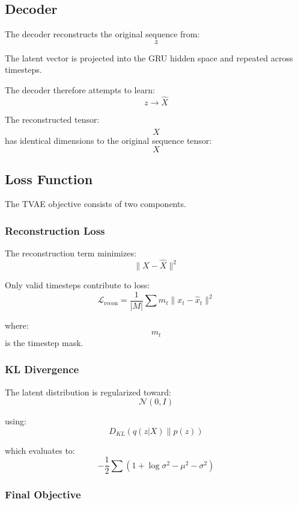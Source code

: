 \documentclass[11pt]{article}
\begin{document}
\subsection{Decoder}

The decoder reconstructs the original sequence from:
\[
z
\]

The latent vector is projected into the GRU hidden space and repeated across timesteps.

The decoder therefore attempts to learn:
\[
z
\rightarrow
\hat X
\]

The reconstructed tensor:
\[
\hat X
\]
has identical dimensions to the original sequence tensor:
\[
X
\]

\subsection{Loss Function}

The TVAE objective consists of two components.

\subsubsection{Reconstruction Loss}

The reconstruction term minimizes:
\[
\|X-\hat X\|^2
\]

Only valid timesteps contribute to loss:
\[
\mathcal{L}_{\text{recon}}
=
\frac{1}{|M|}
\sum
m_t
\|x_t-\hat x_t\|^2
\]

where:
\[
m_t
\]
is the timestep mask.

\subsubsection{KL Divergence}

The latent distribution is regularized toward:
\[
\mathcal{N}(0,I)
\]

using:
\[
D_{KL}
\left(
q(z|X)
\|
p(z)
\right)
\]

which evaluates to:
\[
-\frac12
\sum
\left(
1+\log\sigma^2-\mu^2-\sigma^2
\right)
\]

\subsubsection{Final Objective}
\end{document}
